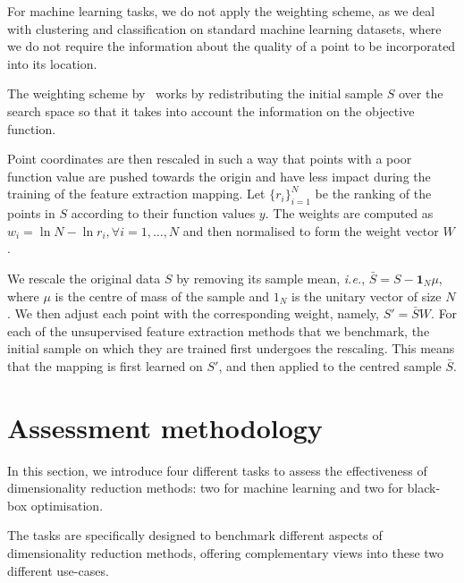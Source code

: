 For machine learning tasks, we do not apply the weighting scheme, as we deal with clustering and classification on standard machine learning datasets, where we do not require the information about the quality of a point to be incorporated into its location.




The weighting scheme by~\citet{RapEtAl20} works by redistributing the initial sample $S$ over the search space so that it takes into account the information on the objective function. 

Point coordinates are then rescaled in such a way that points with a poor function value are pushed towards the origin and have less impact during the training of the feature extraction mapping.
Let $\{r_i\}_{i=1}^N$ be the ranking of the points in $S$ according to their function values $y$. The weights are computed as $w_i = \ln{N} - \ln{r_i}, \forall i=1,\dots,N$ and then normalised to form the weight vector $W$. 

We rescale the original data $S$ by removing its sample mean, \emph{i.e.}, $\bar{S} = S - \mathbf{1}_N\mu$, where
$\mu$ is the centre of mass of the sample and $1_N$ is the unitary vector of size $N$.
We then adjust each point with the corresponding weight, namely, $S' = \bar{S}W$.
For each of the unsupervised feature extraction methods that we benchmark, the initial sample on which they are trained first undergoes the rescaling. This means that the mapping is first learned on $S'$, and then applied to the centred sample $\bar{S}$.


















\section{Assessment methodology}
\label{sec:ch04:tasks}
In this section, we introduce four different tasks to assess the effectiveness of dimensionality reduction methods: two for machine learning and two for black-box optimisation.

The tasks are specifically designed to benchmark different aspects of dimensionality reduction methods, offering complementary views into these two different use-cases.

























